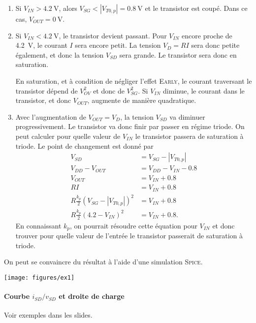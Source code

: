\begin{enumerate}
	\item Si $V_{IN} > \SI{4.2}{\volt}$, alors $V_{SG} < |V_{T0,p}| = \SI{0.8}{\volt}$
	et le transistor est coupé. Dans ce cas, $V_{OUT} = \SI{0}{\volt}$.
	\item Si $V_{IN} < \SI{4.2}{\volt}$, le transistor devient passant. Pour
	$V_{IN}$ encore proche de \SI{4.2}{\volt}, le courant $I$ sera encore
	petit. La tension $V_D = RI$ sera donc petite également, et donc la tension
	$V_{SD}$ sera grande. Le transistor sera donc en saturation.
	
	En saturation, et à condition de négliger l'effet \textsc{Early}, le courant
	traversant le transistor dépend de $V_{OV}^2$ et donc de $V_{SG}^2$. Si $V_{IN}$
	diminue, le courant dans le transistor, et donc $V_{OUT}$, augmente de manière
	quadratique.
	\item Avec l'augmentation de $V_{OUT} = V_D$, la tension $V_{SD}$ va diminuer
	progressivement. Le transistor va donc finir par passer en régime triode.
	On peut calculer pour quelle valeur de $V_{IN}$ le transistor passera de saturation
	à triode. Le point de changement est donné par
	\begin{align*}
		 V_{SD} & = V_{SG} - |V_{T0,p}| \\
		 V_{DD} - V_{OUT} & = V_{DD} - V_{IN} - 0.8 \\
		 V_{OUT} & = V_{IN} + 0.8 \\
		 RI & = V_{IN} + 0.8 \\
		 R\frac{k_p}{2}(V_{SG} - |V_{T0,p}|)^2 & = V_{IN} + 0.8 \\
		 R\frac{k_p}{2}(4.2 - V_{IN})^2 & = V_{IN} + 0.8.
	\end{align*}
	En connaissant $k_p$, on pourrait résoudre cette équation pour $V_{IN}$ et donc
	trouver pour quelle valeur de l'entrée le transistor passerait de saturation à triode.
\end{enumerate}

On peut se convaincre du résultat à l'aide d'une simulation \textsc{Spice}.

\begin{center}
	\texttt{[image: figures/ex1]}
\end{center}
	
\paragraph{Courbe $i_{SD}/v_{SD}$ et droite de charge}
Voir exemples dans les slides.

